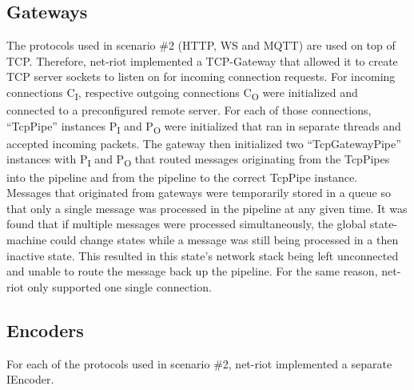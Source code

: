 \subsection{Gateways}
The protocols used in scenario \#2 (\ac{HTTP}, \ac{WS} and \ac{MQTT}) are used on top of \ac{TCP}. Therefore, net-riot implemented a \ac{TCP}-Gateway that allowed it to create \ac{TCP} server sockets to listen on for incoming connection requests. For incoming connections C\textsubscript{I}, respective outgoing connections C\textsubscript{O} were initialized and connected to a preconfigured remote server. For each of those connections, \enquote{TcpPipe} instances P\textsubscript{I} and P\textsubscript{O} were initialized that ran in separate threads and accepted incoming packets. The gateway then initialized two \enquote{TcpGatewayPipe} instances with P\textsubscript{I} and P\textsubscript{O} that routed messages originating from the TcpPipes into the pipeline and from the pipeline to the correct TcpPipe instance.\\
Messages that originated from gateways were temporarily stored in a queue so that only a single message was processed in the pipeline at any given time. It was found that if multiple messages were processed simultaneously, the global state-machine could change states while a message was still being processed in a then inactive state. This resulted in this state's network stack being left unconnected and unable to route the message back up the pipeline. For the same reason, net-riot only supported one single connection.


\subsection{Encoders}
For each of the protocols used in scenario \#2, net-riot implemented a separate IEncoder.
